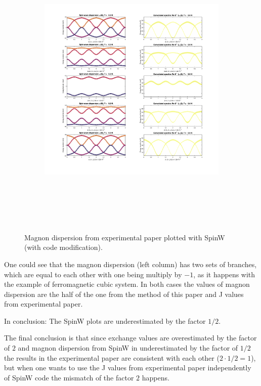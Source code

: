 \documentclass[a4paper,12pt]{article}
\begin{document}
            \begin{figure}[H]
                \centering
                \begin{subfigure}[b]{0.8\textwidth}
                    \centering
                    \includegraphics[height=14cm]{spinw-exp-after.png}
                \end{subfigure}
                \hfill
                \caption{Magnon dispersion from experimental paper plotted with SpinW (with code modification).}
                \label{fig:spinw-exp-after}
            \end{figure}

            One could see that the magnon dispersion (left column) has two sets of branches, 
            which are equal to each other with one being multiply by $-1$, as it happens with the example of ferromagnetic cubic system.
            In both cases the values of magnon dispersion are the half of the one from the method of this paper and J values from experimental paper. 

            In conclusion: The SpinW plots are underestimated by the factor $1/2$.

        The final conclusion is that since exchange values are overestimated by the factor of $2$ and magnon dispersion 
        from SpinW in underestimated by the factor of $1/2$ the results in the experimental paper are consistent with each other ($2 \cdot 1/2 = 1$), 
        but when one wants to use the J values from experimental paper independently of SpinW code the mismatch of the factor $2$ happens.

    

    \begingroup
    \let\clearpage\relax
    
    \endgroup

     
     
\end{document}
